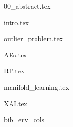 \documentclass[letterpaper, 12pt]{article}
\begin{document}
  {00_abstract.tex}

  {intro.tex}
  
  {outlier_problem.tex}
  
  {AEs.tex}

  {RF.tex}

  {manifold_learning.tex}

  {XAI.tex}
  
  \clearpage
  \newpage

  {bib_env_cols}

  \scriptsize
  
\end{document}
